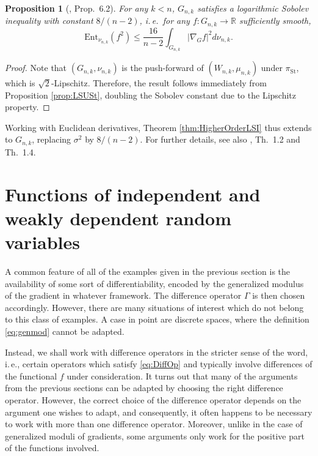 \documentclass[a4paper,12pt]{amsart}
\numberwithin{equation}{section}
\newtheorem{proposition}[satz]{Proposition}
\theoremstyle{remark}
\def\pist{\pi_\mathrm{St}}
\begin{document}
\begin{proposition}[\cite{GS23}, Prop.\ 6.2]\label{prop:LSUGr}
For any $k < n$, $G_{n,k}$ satisfies a logarithmic Sobolev inequality with constant $8/(n-2)$, i.\,e.\ for any $f \colon G_{n,k} \to \mathbb{R}$ sufficiently smooth,
		\[
		\mathrm{Ent}_{\nu_{n,k}} (f^2) \le \frac{16}{n-2} \int_{G_{n,k}} |\nabla_G f|^2 d\nu_{n,k}.
		\]
\end{proposition}

\begin{proof}
	Note that $(G_{n,k}, \nu_{n,k})$ is the push-forward of $(W_{n,k},\mu_{n,k})$ under $\pist$, which is $\sqrt{2}$-Lipschitz. Therefore, the result follows immediately from Proposition \ref{prop:LSUSt}, doubling the Sobolev constant due to the Lipschitz property.
\end{proof}

Working with Euclidean derivatives, Theorem \ref{thm:HigherOrderLSI} thus extends to $G_{n,k}$, replacing $\sigma^2$ by $8/(n-2)$. For further details, see also \cite{GS23}, Th.\ 1.2 and Th.\ 1.4.

\section{Functions of independent and weakly dependent random variables}\label{sec:GenResDisc}

A common feature of all of the examples given in the previous section is the availability of some sort of differentiability, encoded by the generalized modulus of the gradient in whatever framework. The difference operator $\Gamma$ is then chosen accordingly. However, there are many situations of interest which do not belong to this class of examples. A case in point are discrete spaces, where the definition \eqref{eq:genmod} cannot be adapted.

Instead, we shall work with difference operators in the stricter sense of the word, i.\,e., certain operators which satisfy \eqref{eq:DiffOp} and typically involve differences of the functional $f$ under consideration. It turns out that many of the arguments from the previous sections can be adapted by choosing the right difference operator. However, the correct choice of the difference operator depends on the argument one wishes to adapt, and consequently, it often happens to be necessary to work with more than one difference operator. Moreover, unlike in the case of generalized moduli of gradients, some arguments only work for the positive part of the functions involved.
\end{document}

